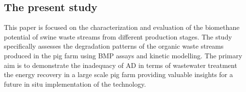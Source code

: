 \subsection{The present study}
This paper is focused on the characterization and evaluation of the biomethane potential of swine waste streams from different production stages. The study specifically assesses the degradation patterns of the organic waste streams produced in the pig farm using BMP assays and kinetic modelling. The primary aim is to demonstrate the inadequacy of AD in terms of wastewater treatment the energy recovery in a large scale pig farm providing valuable insights for a future in situ implementation of the technology.